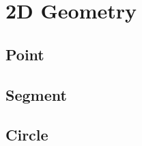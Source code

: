 \newpage
\section{2D Geometry}
	\subsection{Point}
		
	\subsection{Segment}
		
	\subsection{Circle}
		
